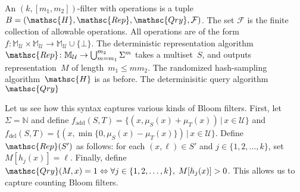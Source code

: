 An $(k,[m_1,m_2])$-filter with operations is a tuple  $B=(\mathsc{H},\mathsc{Rep},\mathsc{Qry}, \mathcal{F})$.  
The set $\mathcal{F}$ is the finite collection of allowable operations.  All operations are of the form 
$f: \mathbb{M}_{\mathcal{U}} \times \mathbb{M}_{\mathcal{U}} \rightarrow \mathbb{M}_{\mathcal{U}} \cup \{\bot\}$.  
%
The deterministic representation algorithm $\mathsc{Rep}\colon \mathbb{M}_\mathcal{U} \rightarrow \bigcup_{m=m_1}^{m_2}\Sigma^m$ takes a multiset~$S$, and outputs representation~$M$ of length~$m_1 \leq m m_2$.   
%
The randomized hash-sampling algorithm~$\mathsc{H}$ is as before.
%
The determinisitic query algorithm $\mathsc{Qry}$ 


Let us see how this syntax captures various kinds of Bloom filters.  First, let $\Sigma = \mathbb{N}$ and define $f_{\mathrm{add}}(S,T)=\{(x,\mu_S(x)+\mu_T(x)) \,|\, x \in \mathcal{U}\}$ and $f_\mathrm{del}(S,T) = \{(x,\min\{0,\mu_S(x)-\mu_T(x)\}) \,|\, x \in \mathcal{U} \}$.  Define $\mathsc{Rep}(S')$ as follows: for each $(x,\ell)\in S'$ and $j\in\{1,2,\ldots,k\}$, set $M[h_j(x)]=\ell$.   Finally, define $\mathsc{Qry}(M,x) = 1 \Leftrightarrow \forall j \in \{1,2,\ldots,k\},\; M[h_j(x)] > 0$.  This allows us to capture counting Bloom filters. 


